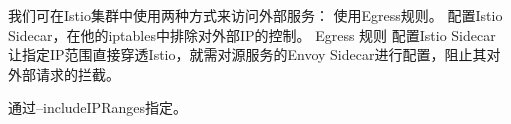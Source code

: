 \documentclass{ctexart}
\begin{document}
我们可在Istio集群中使用两种方式来访问外部服务：
使用Egress规则。
配置Istio Sidecar，在他的iptables中排除对外部IP的控制。 
Egress 规则
配置Istio Sidecar 
让指定IP范围直接穿透Istio，就需对源服务的Envoy Sidecar进行配置，阻止其对外部请求的拦截。

通过--includeIPRanges指定。


\end{document}

